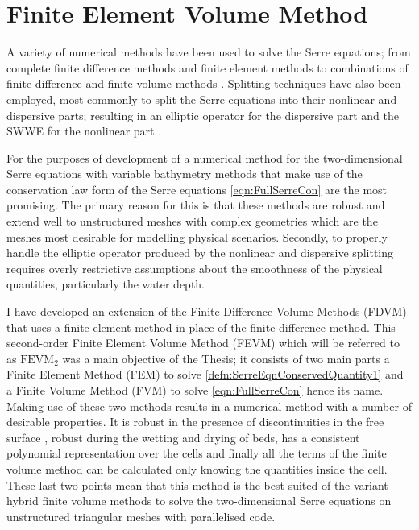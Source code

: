 \chapter{Finite Element Volume Method}
\label{chp:HFVMMethod}
A variety of numerical methods have been used to solve the Serre equations; from complete finite difference methods \cite{Cienfuegos-etal-2006-1217,El-etal-2006} and finite element methods \cite{Mitsotakis-etal-2014,Li-2014-169,Mitsotakis-etal-2017} to combinations of finite difference and finite volume methods \cite{Hank-etal-2010-2034,Zoppou-etal-2017}. Splitting techniques have also been employed, most commonly to split the Serre equations into their nonlinear and dispersive parts; resulting in an elliptic operator for the dispersive part and the SWWE for the nonlinear part \cite{Bradford-Sanders-2002-953,Dutykh-etal-2013-761,Filippini-etal-2016-381}. 

For the purposes of development of a numerical method for the two-dimensional Serre equations with variable bathymetry methods that make use of the conservation law form of the Serre equations \eqref{eqn:FullSerreCon} \cite{Hank-etal-2010-2034,Li-2014-169,Zoppou-etal-2017} are the most promising. The primary reason for this is that these methods are robust and extend well to unstructured meshes with complex geometries which are the meshes most desirable for modelling physical scenarios. Secondly, to properly handle the elliptic operator produced by the nonlinear and dispersive splitting requires overly restrictive assumptions about the smoothness of the physical quantities, particularly the water depth. 

I have developed an extension of the Finite Difference Volume Methods (FDVM) \cite{Hank-etal-2010-2034,Zoppou-etal-2017} that uses a finite element method in place of the finite difference method. This second-order Finite Element Volume Method (FEVM) which will be referred to as $\text{FEVM}_2$ was a main objective of the Thesis; it consists of two main parts a Finite Element Method (FEM) to solve \eqref{defn:SerreEqnConservedQuantity1} and a Finite Volume Method (FVM) to solve \eqref{eqn:FullSerreCon} hence its name. Making use of these two methods results in a numerical method with a number of desirable properties. It is robust in the presence of discontinuities in the free surface \cite{Pitt-2018-61}, robust during the wetting and drying of beds, has a consistent polynomial representation over the cells and finally all the terms of the finite volume method can be calculated only knowing the quantities inside the cell. These last two points mean that this method is the best suited of the variant hybrid finite volume methods \cite{Zoppou-etal-2017} to solve the two-dimensional Serre equations on unstructured triangular meshes with parallelised code.  
 
